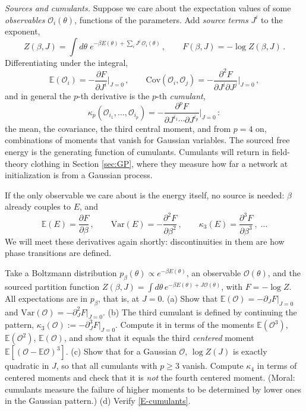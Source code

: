 \documentclass[11pt]{article}
\newcommand{\E}{\mathbb{E}}
\newcommand{\CO}{{\mathcal O}}
\newcommand{\pd}{\partial}
\begin{document}
\emph{Sources and cumulants.} Suppose we care about the expectation values of some \emph{observables} $\CO_i(\theta)$, functions of the parameters. Add \emph{source terms} $J^i$ to the exponent,
%
\begin{equation}
    Z(\beta,J) = \int d\theta\; e^{-\beta E(\theta) + \sum_i J^i\,\CO_i(\theta)}\,,\qquad F(\beta,J) = -\log Z(\beta,J)\,.
\end{equation}
%
Differentiating under the integral,
%
\begin{equation} \label{R-cumulants}
    \E(\CO_i) = -\frac{\pd F}{\pd J^i}\bigg|_{J=0}\,,\qquad
    \mathrm{Cov}(\CO_i,\CO_j) = -\frac{\pd^2 F}{\pd J^i\pd J^j}\bigg|_{J=0}\,,
\end{equation}
%
and in general the $p$-th derivative is the $p$-th \emph{cumulant},
%
\begin{equation}
    \kappa_p(\CO_{i_1},\ldots,\CO_{i_p}) = -\frac{\pd^p F}{\pd J^{i_1}\cdots\pd J^{i_p}}\bigg|_{J=0}\,:
\end{equation}
%
the mean, the covariance, the third central moment, and from $p=4$ on, combinations of moments that vanish for Gaussian variables. The sourced free energy is the generating function of cumulants. Cumulants will return in field-theory clothing in Section \ref{sec:GP}, where they measure how far a network at initialization is from a Gaussian process.

If the only observable we care about is the energy itself, no source is needed: $\beta$ already couples to $E$, and
%
\begin{equation}
    \E(E) = \frac{\pd F}{\pd \beta}\,,\qquad \mathrm{Var}(E) = -\frac{\pd^2 F}{\pd\beta^2}\,,\qquad \kappa_3(E) = \frac{\pd^3 F}{\pd \beta^3}\,,\;\ldots \label{E-cumulants}
\end{equation}
%
We will meet these derivatives again shortly: discontinuities in them are how phase transitions are defined.

\begin{exercise}
\label{ex:cumulants}
\important
Take a Boltzmann distribution $p_\beta(\theta)\propto e^{-\beta E(\theta)}$, an observable $\CO(\theta)$, and the sourced partition function $Z(\beta,J) = \int d\theta\, e^{-\beta E(\theta)+J\CO(\theta)}$, with $F = -\log Z$. All expectations are in $p_\beta$, that is, at $J=0$.
(a) Show that $\E(\CO) = -\pd_JF|_{J=0}$ and $\mathrm{Var}(\CO) = -\pd_J^2F|_{J=0}$.
(b) The third cumulant is defined by continuing the pattern, $\kappa_3(\CO) := -\pd_J^3F|_{J=0}$. Compute it in terms of the moments $\E(\CO^3)$, $\E(\CO^2)$, $\E(\CO)$, and show that it equals the third \emph{centered} moment $\E[(\CO-\E\CO)^3]$.
(c) Show that for a Gaussian $\CO$, $\log Z(J)$ is exactly quadratic in $J$, so that all cumulants with $p\geq 3$ vanish. Compute $\kappa_4$ in terms of centered moments and check that it is \emph{not} the fourth centered moment. (Moral: cumulants measure the failure of higher moments to be determined by lower ones in the Gaussian pattern.)
(d) Verify \eqref{E-cumulants}.
\end{exercise}
\end{document}
